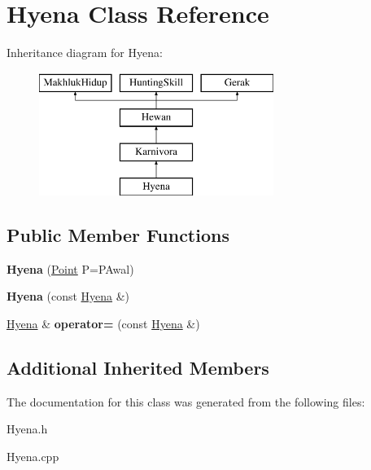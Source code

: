 \hypertarget{class_hyena}{}\section{Hyena Class Reference}
\label{class_hyena}
Inheritance diagram for Hyena\+:\begin{figure}[H]
\begin{center}
\leavevmode
\includegraphics[height=4.000000cm]{class_hyena}
\end{center}
\end{figure}
\subsection*{Public Member Functions}
\begin{DoxyCompactItemize}
\item 
{\bfseries Hyena} (\hyperlink{class_point}{Point} P=P\+Awal)\hypertarget{class_hyena_a292b721b429049ebbc7d11d76798dc14}{}\label{class_hyena_a292b721b429049ebbc7d11d76798dc14}

\item 
{\bfseries Hyena} (const \hyperlink{class_hyena}{Hyena} \&)\hypertarget{class_hyena_a261b14d60aa75d8184e71e83fcaa75bb}{}\label{class_hyena_a261b14d60aa75d8184e71e83fcaa75bb}

\item 
\hyperlink{class_hyena}{Hyena} \& {\bfseries operator=} (const \hyperlink{class_hyena}{Hyena} \&)\hypertarget{class_hyena_a0a0cc552d76578d0f000b36c9d863855}{}\label{class_hyena_a0a0cc552d76578d0f000b36c9d863855}

\end{DoxyCompactItemize}
\subsection*{Additional Inherited Members}


The documentation for this class was generated from the following files\+:\begin{DoxyCompactItemize}
\item 
Hyena.\+h\item 
Hyena.\+cpp\end{DoxyCompactItemize}
